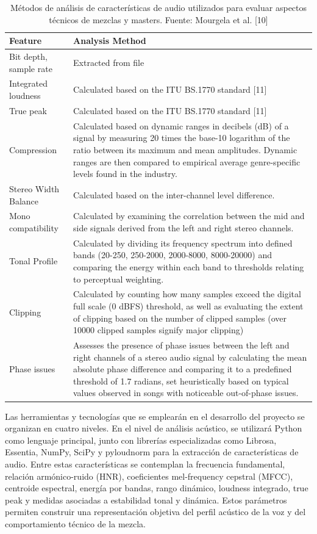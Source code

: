\begin{table}[h!]
\centering
\caption{Métodos de análisis de características de audio utilizados para evaluar aspectos técnicos de mezclas y masters. Fuente: Mourgela et al. [10]}
\label{tab:mourgela}
\begin{tabular}{|p{3.2cm}|p{9.5cm}|}
\hline
\textbf{Feature} & \textbf{Analysis Method} \\
\hline
Bit depth, sample rate & Extracted from file \\
\hline
Integrated loudness & Calculated based on the ITU BS.1770 standard [11] \\
\hline
True peak & Calculated based on the ITU BS.1770 standard [11] \\
\hline
Compression & Calculated based on dynamic ranges in decibels (dB) of a signal by measuring 20 times the base-10 logarithm of the ratio between its maximum and mean amplitudes. Dynamic ranges are then compared to empirical average genre-specific levels found in the industry. \\
\hline
Stereo Width Balance & Calculated based on the inter-channel level difference. \\
\hline
Mono compatibility & Calculated by examining the correlation between the mid and side signals derived from the left and right stereo channels. \\
\hline
Tonal Profile & Calculated by dividing its frequency spectrum into defined bands (20-250, 250-2000, 2000-8000, 8000-20000) and comparing the energy within each band to thresholds relating to perceptual weighting. \\
\hline
Clipping & Calculated by counting how many samples exceed the digital full scale (0 dBFS) threshold, as well as evaluating the extent of clipping based on the number of clipped samples (over 10000 clipped samples signify major clipping) \\
\hline
Phase issues & Assesses the presence of phase issues between the left and right channels of a stereo audio signal by calculating the mean absolute phase difference and comparing it to a predefined threshold of 1.7 radians, set heuristically based on typical values observed in songs with noticeable out-of-phase issues. \\
\hline
\end{tabular}
\end{table}

Las herramientas y tecnologías que se emplearán en el desarrollo del proyecto se organizan en cuatro niveles. En el nivel de análisis acústico, se utilizará Python como lenguaje principal, junto con librerías especializadas como Librosa, Essentia, NumPy, SciPy y pyloudnorm para la extracción de características de audio. Entre estas características se contemplan la frecuencia fundamental, relación armónico-ruido (HNR), coeficientes mel-frequency cepstral (MFCC), centroide espectral, energía por bandas, rango dinámico, loudness integrado, true peak y medidas asociadas a estabilidad tonal y dinámica. Estos parámetros permiten construir una representación objetiva del perfil acústico de la voz y del comportamiento técnico de la mezcla.

